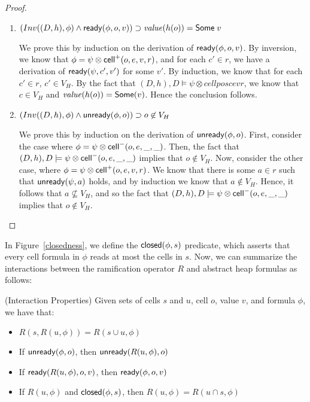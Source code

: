 \begin{proof}
\begin{enumerate}
\item $(Inv((D,h), \phi) \land \mathsf{ready}({\phi}, {o}, {v})) \supset \mathit{value}(h(o)) = \mathsf{Some}\;v$

We prove this by induction on the derivation of
$\mathsf{ready}({\phi}, {o}, {v})$. By inversion, we know that $\phi = \psi \otimes
\mathsf{cell}^{+}({o}, {e}, {v}, {r})$, and for each $c' \in r$, we have a derivation
of $\mathsf{ready}({\psi}, {c'}, {v'})$ for some $v'$. By induction, we know that
for each $c' \in r$, $c' \in V_H$. By the fact that $(D,h), D \models
\psi \otimes cellpos{c}{e}{v}{r}$, we know that $c \in V_H$ and
$\mathit{value}(h(o)) = \mathsf{Some}(v)$. Hence the conclusion follows. 

\item $(Inv((D,h), \phi) \land \mathsf{unready}({\phi}, {o})) \supset o \not\in V_H$

We prove this by induction on the derivation of $\mathsf{unready}({\phi}, {o})$.
First, consider the case where $\phi = \psi \otimes \mathsf{cell}^{-}({o}, {e}, {\_}, {\_})$. 
Then, the fact that $(D,h), D \models \psi \otimes \mathsf{cell}^{-}({o}, {e}, {\_}, {\_})$
implies that $o \not\in V_H$. Now, consider the other case, where 
$\phi = \psi \otimes \mathsf{cell}^{+}({o}, {e}, {v}, {r})$. We know that there is
some $a \in r$ such that $\mathsf{unready}({\psi}, {a})$ holds, and by induction
we know that $a \not\in V_H$. Hence, it follows that $a \not\subseteq V_H$,
and so the fact that $(D,h), D \models \psi \otimes \mathsf{cell}^{-}({o}, {e}, {\_}, {\_})$ implies
that $o \not\in V_H$. 
\end{enumerate}
\end{proof}


In Figure~\ref{closedness}, we define the $\mathsf{closed}({\phi}, {s})$ predicate,
which asserts that every cell formula in $\phi$ reads at most the
cells in $s$. Now, we can summarize the interactions between the 
ramification operator $R$ and abstract heap formulas as follows: 

\begin{prop}{(Interaction Properties)}
Given sets of cells $s$ and $u$, cell $o$, value $v$, and formula $\phi$, we have
that:
\begin{itemize}
\item $R(s, R(u, \phi)) = R(s \cup u, \phi)$
\item If $\mathsf{unready}({\phi}, {o})$, then $\mathsf{unready}({R(u, \phi)}, {o})$ 
\item If $\mathsf{ready}({R(u, \phi)}, {o}, {v})$, then $\mathsf{ready}({\phi}, {o}, {v})$ 
\item If $R(u, \phi)$ and $\mathsf{closed}({\phi}, {s})$, then $R(u, \phi) = R(u \cap s, \phi)$ 
\end{itemize}
\end{prop}

